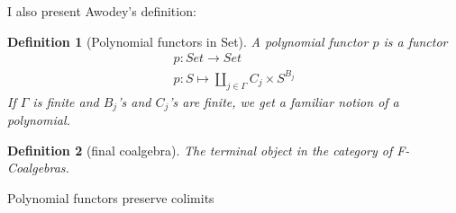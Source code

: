 \documentclass{article}
\newtheorem{definition}{Definition}[section]
\begin{document}
    I also present Awodey's definition:
    \begin{definition}[Polynomial functors in Set]
        A polynomial functor \(p\) is a functor 
        \begin{align*}
            p:Set\to Set\\
            p:S\mapsto \coprod_{j\in\Gamma} C_j \times S^{B_j}
        \end{align*}
        If \(\Gamma\) is finite and \(B_j\)'s and \(C_j\)'s are finite, we get a familiar notion of a polynomial.
    \end{definition}
    
    \begin{definition}[final coalgebra]
        The terminal object in the category of F-Coalgebras.
    \end{definition}

    Polynomial functors preserve colimits
\end{document}

